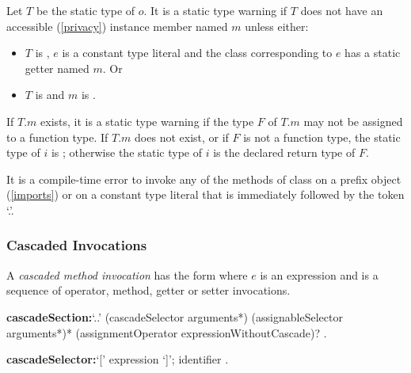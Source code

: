 \documentclass{article}
\begin{document}

\LMHash{}
Let $T$ be the static type of $o$.
It is a static type warning if $T$ does not have an accessible (\ref{privacy}) instance member named $m$ unless either:
\begin{itemize}
\item $T$ is , $e$ is a constant type literal and the class corresponding to $e$ has a static getter named $m$.
Or
\item $T$ is  and $m$ is \CALL.
\end{itemize}

\LMHash{}
If $T.m$ exists, it is a static type warning if the type $F$ of $T.m$ may not be assigned to a function type.
If $T.m$ does not exist, or if $F$ is not a function type, the static type of $i$ is \DYNAMIC{}; otherwise the static type of $i$ is the declared return type of $F$.

\LMHash{}
It is a compile-time error to invoke any of the methods of class  on a prefix object (\ref{imports}) or on a constant type literal that is immediately followed by the token `.'.


\subsubsection{Cascaded Invocations}

\LMHash{}
A {\em cascaded method invocation} has the form 
where $e$ is an expression and  is a sequence of operator, method, getter or setter invocations.

\begin{grammar}
{\bf cascadeSection:}`{\escapegrammar ..}' (cascadeSelector arguments*) (assignableSelector arguments*)* (assignmentOperator expressionWithoutCascade)?
  .

{\bf cascadeSelector:}`[' expression `]';
  identifier
  .
\end{grammar}
\end{document}
